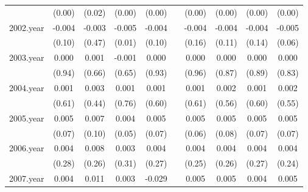 {\begin{tabular}{l*{9}{c}}
          &   (0.00)         &   (0.02)         &   (0.00)         &   (0.00)         &                  &   (0.00)         &   (0.00)         &   (0.00)         &   (0.00)         \\
[1em]
2002.year &   -0.004         &   -0.003         &   -0.005\sym{**} &   -0.004         &                  &   -0.004         &   -0.004         &   -0.004         &   -0.005         \\
          &   (0.10)         &   (0.47)         &   (0.01)         &   (0.10)         &                  &   (0.16)         &   (0.11)         &   (0.14)         &   (0.06)         \\
[1em]
2003.year &    0.000         &    0.001         &   -0.001         &    0.000         &                  &    0.000         &    0.000         &    0.000         &    0.000         \\
          &   (0.94)         &   (0.66)         &   (0.65)         &   (0.93)         &                  &   (0.96)         &   (0.87)         &   (0.89)         &   (0.83)         \\
[1em]
2004.year &    0.001         &    0.003         &    0.001         &    0.001         &                  &    0.001         &    0.002         &    0.001         &    0.002         \\
          &   (0.61)         &   (0.44)         &   (0.76)         &   (0.60)         &                  &   (0.61)         &   (0.56)         &   (0.60)         &   (0.55)         \\
[1em]
2005.year &    0.005         &    0.007         &    0.004\sym{*}  &    0.005         &                  &    0.005         &    0.005         &    0.005         &    0.005         \\
          &   (0.07)         &   (0.10)         &   (0.05)         &   (0.07)         &                  &   (0.06)         &   (0.08)         &   (0.07)         &   (0.07)         \\
[1em]
2006.year &    0.004         &    0.008         &    0.003         &    0.004         &                  &    0.004         &    0.004         &    0.004         &    0.004         \\
          &   (0.28)         &   (0.26)         &   (0.31)         &   (0.27)         &                  &   (0.25)         &   (0.26)         &   (0.27)         &   (0.24)         \\
[1em]
2007.year &    0.004         &    0.011         &    0.003         &   -0.029\sym{**} &                  &    0.005         &    0.005         &    0.004         &    0.005         \\

\end{tabular}}
